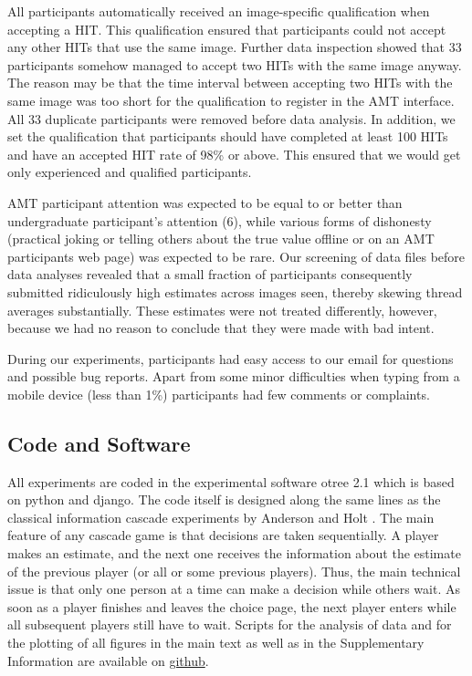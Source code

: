 \documentclass[9pt,twoside,lineno]{pnas-new}
\begin{document}
All participants automatically received an image-specific qualification when accepting a HIT. This qualification ensured that participants could not accept any other HITs that use the same image. Further data inspection showed that 33 participants somehow managed to accept two HITs with the same image anyway. The reason may be that the time interval between accepting two HITs with the same image was too short for the qualification to register in the AMT interface. All 33 duplicate participants were removed before data analysis. In addition, we set the qualification that participants should have completed at least 100 HITs and have an accepted HIT rate of 98\% or above. This ensured that we would get only experienced and qualified participants.

AMT participant attention was expected to be equal to or better than undergraduate participant’s attention (6), while various forms of dishonesty (practical joking or telling others about the true value offline or on an AMT participants web page) was expected to be rare. Our screening of data files before data analyses revealed that a small fraction of participants consequently submitted ridiculously high estimates across images seen, thereby skewing thread averages substantially. These estimates were not treated differently, however, because we had no reason to conclude that they were made with bad intent.

During our experiments, participants had easy access to our email for questions and possible bug reports. Apart from some minor difficulties when typing from a mobile device (less than 1\%) participants had few comments or complaints.

\subsection*{Code and Software}
All experiments are coded in the experimental software otree 2.1 \cite{chen2016otree} which is based on python and django. The code itself is designed along the same lines as the classical information cascade experiments by Anderson and Holt \cite{anderson1997information}. The main feature of any cascade game is that decisions are taken sequentially. A player makes an estimate, and the next one receives the information about the estimate of the previous player (or all or some previous players). Thus, the main technical issue is that only one person at a time can make a decision while others wait. As soon as a player finishes and leaves the choice page, the next player enters while all subsequent players still have to wait. Scripts for the analysis of data and for the plotting of all figures in the main text as well as in the Supplementary Information are available on \href{https://github.com/gavstrik/WoT}{github}.
\end{document}
